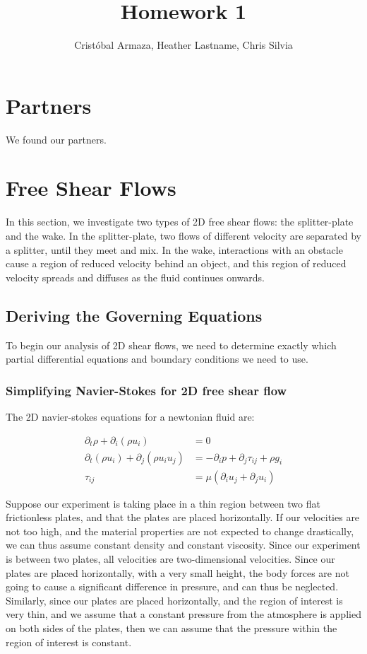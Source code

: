 \documentclass{article}
\title{Homework 1}
\author{Crist\'obal Armaza, Heather Lastname, Chris Silvia}
\begin{document}
\maketitle

\section{Partners}

We found our partners.

\section{Free Shear Flows}

In this section, we investigate two types of 2D free shear flows:
	the splitter-plate and the wake.
In the splitter-plate, two flows of different velocity are separated by
	a splitter, until they meet and mix.
In the wake, interactions with an obstacle cause a region of reduced
	velocity behind an object, and this region of reduced
	velocity spreads and diffuses as the fluid continues onwards.

\subsection{Deriving the Governing Equations}

To begin our analysis of 2D shear flows, we need to determine exactly 
	which partial differential equations and boundary conditions
	we need to use.

\subsubsection{Simplifying Navier-Stokes for 2D free shear flow}

The 2D navier-stokes equations for a newtonian fluid are:

\begin{align}
\partial_t \rho + \partial_i \left( \rho u_i \right) & = 0 \\
\partial_t \left( \rho u_i \right) + \partial_j \left( \rho u_i u_j \right)
	& = - \partial_i p + \partial_j \tau_{ij} + \rho g_i\\
\tau_{ij} & = \mu \left( \partial_i u_j + \partial_j u_i \right)
\end{align}

Suppose our experiment is taking place in a thin region between two
	flat frictionless plates, and that the plates are placed horizontally.
If our velocities are not too high, and the material properties are not
	expected to change drastically, we can thus assume constant
	density and constant viscosity.
Since our experiment is between two plates, all velocities are two-dimensional
	velocities.
Since our plates are placed horizontally, with a very small height,
	the body forces are not going to cause a significant difference
	in pressure, and can thus be neglected.
Similarly, since our plates are placed horizontally, and the region
	of interest is very thin, and we assume that a constant pressure
	from the atmosphere is applied on both sides of the plates,
	then we can assume that the pressure within the region of 
	interest is constant.
\end{document}

